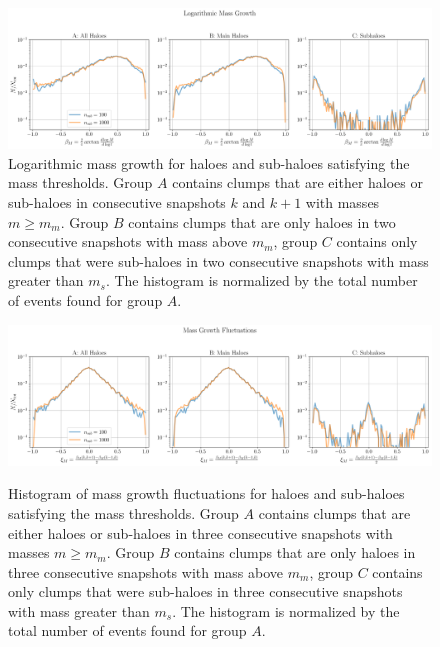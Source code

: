 \documentclass[a4paper,twocolumn,fleqn,usenatbib]{mnras}
\providecommand{\DIFaddend}{} %
\DeclareRobustCommand{\DIFaddend}{\DIFOaddend \let\includegraphics\DIFOincludegraphics} %
\begin{document}
\DIFaddend \begin{figure}
	\centering
	\includegraphics[width=\textwidth, keepaspectratio]{images/tree-statistics-sussing-threshold/mass_growth-ntrace.png}%
	\caption{
		Logarithmic mass growth for haloes and sub-haloes satisfying the mass thresholds.
		Group $A$ contains clumps that are either haloes or sub-haloes in consecutive snapshots $k$ and $k+1$ with masses $m \geq m_{m}$.
		Group $B$ contains clumps that are only haloes in two consecutive snapshots with mass above $m_{m}$, group $C$ contains only clumps that were sub-haloes in two consecutive snapshots with mass greater than $m_{s}$.
		The histogram is normalized by the total number of events found for group $A$.
	}%
	\label{fig:sussing-mass-growth}
\end{figure}

\begin{figure}
	\centering
	\includegraphics[width=\textwidth, keepaspectratio]{images/tree-statistics-sussing-threshold/mass_fluctuations-ntrace.png}\\%
	\caption{
		Histogram of mass growth fluctuations for haloes and sub-haloes satisfying the mass thresholds.
		Group $A$ contains clumps that are either haloes or sub-haloes in three consecutive snapshots with masses $m \geq m_{m}$.
		Group $B$ contains clumps that are only haloes in three consecutive snapshots with mass above $m_{m}$, group $C$ contains only clumps that were sub-haloes in three consecutive snapshots with mass greater than $m_{s}$.
		The histogram is normalized by the total number of events found for group $A$.
	}%
	\label{fig:sussing-mass-fluct}
\end{figure}
\end{document}
